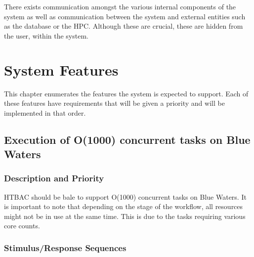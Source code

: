 \documentclass{scrreprt}
\begin{document}
There exists communication amongst the various internal components of the system as well as communication between the system and external entities such as the database or the HPC. Although these are crucial, these are hidden from the user, within the system.


\chapter{System Features}

This chapter enumerates the features the system is expected to support. Each of these features have requirements that will be given a priority and will be implemented in that order. 

\section{Execution of O(1000) concurrent tasks on Blue Waters}


\subsection{Description and Priority}

HTBAC should be bale to support O(1000) concurrent tasks on Blue Waters. It is important to note that depending on the stage of the workflow, all resources might not be in use at the same time. This is due to the tasks requiring various core counts.


\subsection{Stimulus/Response Sequences}
\end{document}
